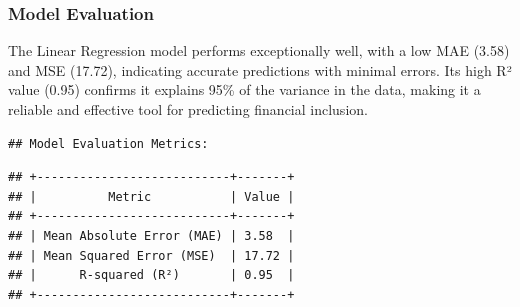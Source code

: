 \documentclass[preprint, 3p,
authoryear]{elsarticle} %
\begin{document}
\subsubsection{Model Evaluation}\label{model-evaluation-1}

The Linear Regression model performs exceptionally well, with a low MAE
(3.58) and MSE (17.72), indicating accurate predictions with minimal
errors. Its high R² value (0.95) confirms it explains 95\% of the
variance in the data, making it a reliable and effective tool for
predicting financial inclusion.

\begin{verbatim}
## Model Evaluation Metrics:
\end{verbatim}

\begin{verbatim}
## +---------------------------+-------+
## |          Metric           | Value |
## +---------------------------+-------+
## | Mean Absolute Error (MAE) | 3.58  |
## | Mean Squared Error (MSE)  | 17.72 |
## |      R-squared (R²)       | 0.95  |
## +---------------------------+-------+
\end{verbatim}

\newpage

\renewcommand\refname{References}

\end{document}
